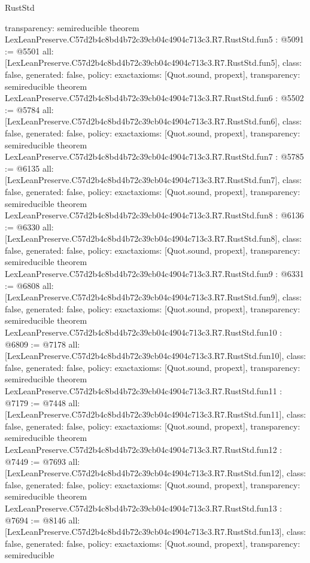 \begin{lexlean}{RustStd}
\begin{coremodule}
{  transparency: semireducible
}
theorem LexLeanPreserve.C57d2b4c8bd4b72c39cb04c4904c713c3.R7.RustStd.fun5 : @5091 := @5501 {
  all: [LexLeanPreserve.C57d2b4c8bd4b72c39cb04c4904c713c3.R7.RustStd.fun5],
  class: false,
  generated: false,
  policy: exact{axioms: [Quot.sound, propext]},
  transparency: semireducible
}
theorem LexLeanPreserve.C57d2b4c8bd4b72c39cb04c4904c713c3.R7.RustStd.fun6 : @5502 := @5784 {
  all: [LexLeanPreserve.C57d2b4c8bd4b72c39cb04c4904c713c3.R7.RustStd.fun6],
  class: false,
  generated: false,
  policy: exact{axioms: [Quot.sound, propext]},
  transparency: semireducible
}
theorem LexLeanPreserve.C57d2b4c8bd4b72c39cb04c4904c713c3.R7.RustStd.fun7 : @5785 := @6135 {
  all: [LexLeanPreserve.C57d2b4c8bd4b72c39cb04c4904c713c3.R7.RustStd.fun7],
  class: false,
  generated: false,
  policy: exact{axioms: [Quot.sound, propext]},
  transparency: semireducible
}
theorem LexLeanPreserve.C57d2b4c8bd4b72c39cb04c4904c713c3.R7.RustStd.fun8 : @6136 := @6330 {
  all: [LexLeanPreserve.C57d2b4c8bd4b72c39cb04c4904c713c3.R7.RustStd.fun8],
  class: false,
  generated: false,
  policy: exact{axioms: [Quot.sound, propext]},
  transparency: semireducible
}
theorem LexLeanPreserve.C57d2b4c8bd4b72c39cb04c4904c713c3.R7.RustStd.fun9 : @6331 := @6808 {
  all: [LexLeanPreserve.C57d2b4c8bd4b72c39cb04c4904c713c3.R7.RustStd.fun9],
  class: false,
  generated: false,
  policy: exact{axioms: [Quot.sound, propext]},
  transparency: semireducible
}
theorem LexLeanPreserve.C57d2b4c8bd4b72c39cb04c4904c713c3.R7.RustStd.fun10 : @6809 := @7178 {
  all: [LexLeanPreserve.C57d2b4c8bd4b72c39cb04c4904c713c3.R7.RustStd.fun10],
  class: false,
  generated: false,
  policy: exact{axioms: [Quot.sound, propext]},
  transparency: semireducible
}
theorem LexLeanPreserve.C57d2b4c8bd4b72c39cb04c4904c713c3.R7.RustStd.fun11 : @7179 := @7448 {
  all: [LexLeanPreserve.C57d2b4c8bd4b72c39cb04c4904c713c3.R7.RustStd.fun11],
  class: false,
  generated: false,
  policy: exact{axioms: [Quot.sound, propext]},
  transparency: semireducible
}
theorem LexLeanPreserve.C57d2b4c8bd4b72c39cb04c4904c713c3.R7.RustStd.fun12 : @7449 := @7693 {
  all: [LexLeanPreserve.C57d2b4c8bd4b72c39cb04c4904c713c3.R7.RustStd.fun12],
  class: false,
  generated: false,
  policy: exact{axioms: [Quot.sound, propext]},
  transparency: semireducible
}
theorem LexLeanPreserve.C57d2b4c8bd4b72c39cb04c4904c713c3.R7.RustStd.fun13 : @7694 := @8146 {
  all: [LexLeanPreserve.C57d2b4c8bd4b72c39cb04c4904c713c3.R7.RustStd.fun13],
  class: false,
  generated: false,
  policy: exact{axioms: [Quot.sound, propext]},
  transparency: semireducible
}
\end{coremodule}
\end{lexlean}
